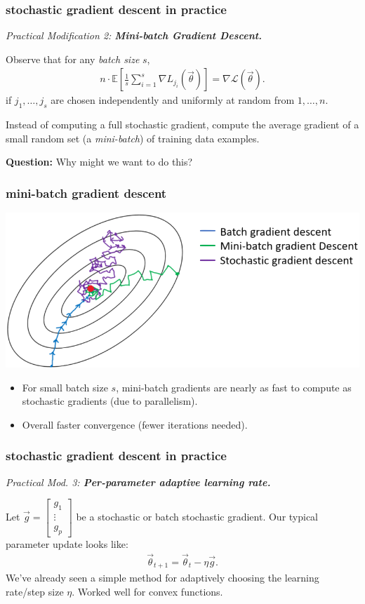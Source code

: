 \documentclass[handout,compress]{beamer}
\newcommand{\E}{\mathbb{E}}
\begin{document}
	\begin{frame}
		\frametitle{stochastic gradient descent in practice}
		\emph{Practical Modification 2: \textbf{Mini-batch Gradient Descent.}}
		
		Observe that for any \emph{batch size} $s$,
		\begin{align*}
		n\cdot\E\left[\frac{1}{s}\sum_{i=1}^s\nabla L_{j_i}(\vec{\theta}) \right] = \nabla \mathcal{L}(\vec{\theta}).
		\end{align*}
		if $j_1, \ldots, j_s$ are chosen independently and uniformly at random from $1, \ldots, n$.
		
		Instead of computing a full stochastic gradient, compute the average gradient of a small random set (a \emph{mini-batch}) of training data examples. 
		
		\textbf{Question:} Why might we want to do this?
		
	\end{frame}
	
	\begin{frame}
		\frametitle{mini-batch gradient descent}
		\begin{center}
			\includegraphics[width=.7\textwidth]{sgd_v_batch.png}
		\end{center}
		\begin{itemize}
			\item For small batch size $s$, mini-batch gradients are nearly as fast to compute as stochastic gradients (due to parallelism).  
			\item Overall faster convergence (fewer iterations needed). 
		\end{itemize}
		
	\end{frame}

	\begin{frame}
	\frametitle{stochastic gradient descent in practice}
	\emph{Practical Mod. 3: \textbf{Per-parameter adaptive learning rate.}}
	
	Let $\vec{g} = \begin{bmatrix}g_1\\\vdots\\g_p\end{bmatrix}$ be a stochastic or batch stochastic gradient. Our typical parameter update looks like:
	\begin{align*}
	\vec{\theta}_{t+1} = \vec{\theta}_{t} - \eta \vec{g}.
	\end{align*}
	We've already seen a simple method for adaptively choosing the learning rate/step size $\eta$. Worked well for convex functions. 
\end{frame}
\end{document}
